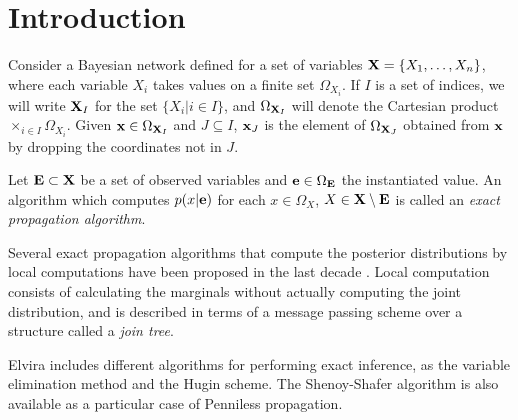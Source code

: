 \section{Introduction}

Consider a Bayesian network defined for a set of variables $\mathbf{X}=\{
X_1,\ldots,X_n\}$, where each variable $X_i$ takes values on a
finite set $\Omega_{X_i}$. If $I$ is a set of indices, we will
write $\mathbf{X}_I$ for the set $\{ X_i|i\in I\}$, and $\Omega_{\mathbf{X}_I}$
will denote the Cartesian product $\times_{i\in I}\Omega_{X_i}$.
Given $\mathbf{x}\in \Omega_{\mathbf{X}_I}$ and $J\subseteq I$,  $\mathbf{x}_J$ is the
element of $\Omega_{\mathbf{X}_J}$ obtained from $\mathbf{x}$ by dropping the
coordinates not in $J$.

\begin{definition} \label{def:propagation} Let $\mathbf{E}\subset \mathbf{X}$ be a set
of observed variables and $\mathbf{e}\in\Omega_{\mathbf{E}}$ the instantiated
value. An algorithm which computes $p(x|\mathbf{e})$ for each
$x\in\Omega_{X}$, $X\in \mathbf{X}\setminus \mathbf{E}$ is called an {\em exact
propagation algorithm}.
\end{definition}

Several exact propagation algorithms that compute the posterior
distributions by local computations have been proposed in the last
decade \cite{Jen90,Lau88,Mad99,She97,She90}. Local computation
consists of calculating the marginals without actually computing
the joint distribution, and is described in terms of a message
passing scheme over a structure called a {\em join tree}.

Elvira includes different algorithms for performing exact
inference, as the variable elimination method and the Hugin
scheme. The Shenoy-Shafer algorithm is also available as a
particular case of Penniless propagation.
